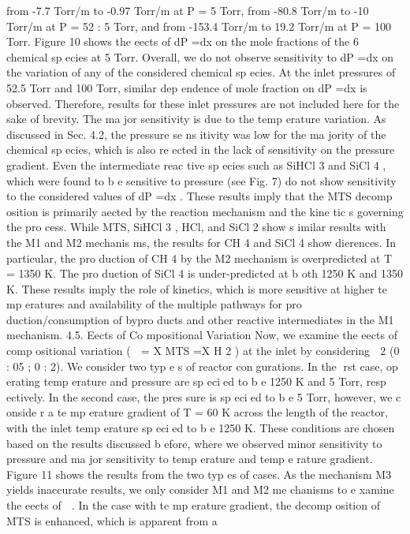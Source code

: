 \documentclass[10pt, letterpaper]{article}
\begin{document}
from -7.7 Torr/m to -0.97 Torr/m at
P
= 5 Torr, from -80.8 Torr/m to -10 Torr/m at
P
= 52
:
5 Torr, and
from -153.4 Torr/m to 19.2 Torr/m at
P
= 100 Torr.
Figure 10 shows the eects of
dP =dx
on the mole fractions of the 6 chemical sp ecies at 5 Torr. Overall, we
do not observe sensitivity to
dP =dx
on the variation of any of the considered chemical sp ecies. At the inlet
pressures of 52.5 Torr and 100 Torr, similar dep endence of mole fraction on
dP =dx
is observed. Therefore,
results for these inlet pressures are not included here for the sake of brevity. The ma jor sensitivity is due
to the temp erature variation. As discussed in Sec. 4.2, the pressure se ns itivity was low for the ma jority
of the chemical sp ecies, which is also re
ected in the lack of sensitivity on the pressure gradient. Even
the intermediate reac tive sp ecies such as SiHCl
3
and SiCl
4
, which were found to b e sensitive to pressure
(see Fig. 7) do not show sensitivity to the considered values of
dP =dx
. These results imply that the MTS
decomp osition is primarily aected by the reaction mechanism and the kine tic s governing the pro cess.
While MTS, SiHCl
3
, HCl, and SiCl
2
show s imilar results with the M1 and M2 mechanis ms, the results for
CH
4
and SiCl
4
show dierences. In particular, the pro duction of CH
4
by the M2 mechanism is overpredicted
at T = 1350 K. The pro duction of SiCl
4
is under-predicted at b oth 1250 K and 1350 K. These results imply
the role of kinetics, which is more sensitive at higher te mp eratures and availability of the multiple pathways
for pro duction/consumption of bypro ducts and other reactive intermediates in the M1 mechanism.
4.5. Eects of Co mpositional Variation
Now, we examine the eects of comp ositional variation (

=
X
MTS
=X
H
2
) at the inlet by considering

2
(0
:
05
;
0
:
2). We consider two typ e s of reactor congurations. In the rst case, op erating temp erature and
pressure are sp ecied to b e 1250 K and 5 Torr, resp ectively. In the second case, the pres sure is sp ecied to b e
5 Torr, however, we c onside r a te mp erature gradient of 
T
= 60 K across the length of the reactor, with the
inlet temp erature sp ecied to b e 1250 K. These conditions are chosen based on the results discussed b efore,
where we observed minor sensitivity to pressure and ma jor sensitivity to temp erature and temp e rature
gradient. Figure 11 shows the results from the two typ es of cases. As the mechanism M3 yields inaccurate
results, we only consider M1 and M2 me chanisms to e xamine the eects of

.
In the case with te mp erature gradient, the decomp osition of MTS is enhanced, which is apparent from a
\end{document}
